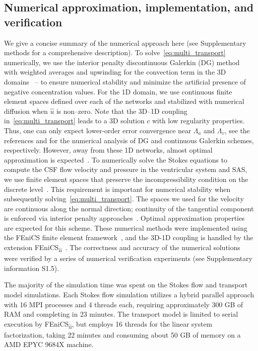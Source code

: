 \documentclass[fleqn,10pt]{wlscirep}
\begin{document}
\subsection*{Numerical approximation, implementation, and verification}

We give a concise summary of the numerical approach here (see
Supplementary methods for a comprehensive description). To
solve~\eqref{eq:multi_transport} numerically, we use the interior
penalty discontinuous Galerkin (DG) method with weighted averages and
upwinding for the convection term in the 3D
domains~\cite{ern2009discontinuous} -- to ensure numerical stability
and minimize the artificial presence of negative concentration
values. For the 1D domain, we use continuous finite element spaces
defined over each of the networks and stabilized with numerical
diffusion when $\hat{u}$ is non--zero. Note that the 3D--1D coupling
in~\eqref{eq:multi_transport} leads to a 3D solution $c$ with low
regularity properties. Thus, one can only expect lower-order error
convergence near $\Lambda_a$ and $\Lambda_v$, see the references
\cite{masri2024discontinuous} and \cite{laurino2019derivation} for the
numerical analysis of DG and continuous Galerkin schemes,
respectively. However, away from these 1D networks, almost optimal
approximation is
expected~\cite{masri2023discontinuous,koppl2016local}. To numerically
solve the Stokes equations to compute the CSF flow velocity and
pressure in the ventricular system and SAS, we use finite element
spaces that preserve the incompressibility condition on the discrete
level~\cite{hong2016robust}. This requirement is important for
numerical stability when subsequently
solving~\eqref{eq:multi_transport}\cite{cesmelioglu2022compatible}.
The spaces we used for the velocity are continuous along the normal
direction; continuity of the tangential component is enforced via
interior penalty approaches~\cite{hong2016robust}. Optimal
approximation properties are expected for this scheme. These numerical
methods were implemented using the FEniCS finite element
framework~\cite{alnaes2015fenics}, and the 3D-1D coupling is handled
by the extension FEniCS\textsubscript{ii}~\cite{kuchta2020assembly}.
The correctness and accuracy of the numerical solutions were verified
by a series of numerical verification experiments (see Supplementary
information S1.5).

The majority of the simulation time was spent on the Stokes flow and transport model simulations. Each Stokes flow simulation utilizes a hybrid parallel approach with 16 MPI processes and 4 threads each, requiring approximately 300 GB of RAM and completing in 23 minutes. The transport model is limited to serial execution by FEniCS\textsubscript{ii}, but employs 16 threads for the linear system factorization, taking 22 minutes and consuming about 50 GB of memory on a AMD EPYC 9684X machine.
\end{document}
